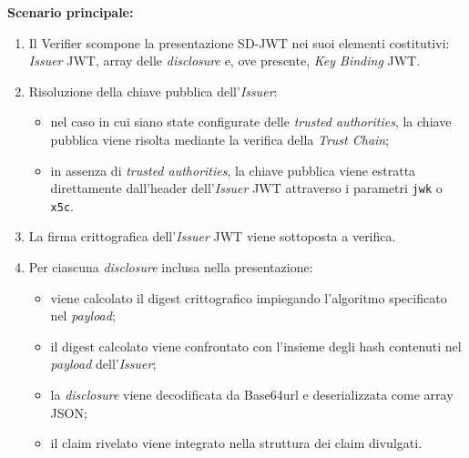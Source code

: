 \noindent\textbf{Scenario principale:}
\begin{enumerate}
    \item Il Verifier scompone la presentazione SD-JWT nei suoi elementi costitutivi: \textit{Issuer} JWT, array delle \textit{disclosure} e, ove presente, \textit{Key Binding} JWT.
    \item Risoluzione della chiave pubblica dell'\textit{Issuer}:
    \begin{itemize}
        \item nel caso in cui siano state configurate delle \textit{trusted authorities}, la chiave pubblica viene risolta mediante la verifica della \textit{Trust Chain};
        \item in assenza di \textit{trusted authorities}, la chiave pubblica viene estratta direttamente dall'header dell'\textit{Issuer} JWT attraverso i parametri \texttt{jwk} o \texttt{x5c}.
    \end{itemize}
    \item La firma crittografica dell'\textit{Issuer} JWT viene sottoposta a verifica.
    \item Per ciascuna \textit{disclosure} inclusa nella presentazione:
    \begin{itemize}
        \item viene calcolato il digest crittografico impiegando l'algoritmo specificato nel \textit{payload};
        \item il digest calcolato viene confrontato con l'insieme degli hash contenuti nel \textit{payload} dell'\textit{Issuer};
        \item la \textit{disclosure} viene decodificata da Base64url e deserializzata come array JSON;
        \item il claim rivelato viene integrato nella struttura dei claim divulgati.
    \end{itemize}
\end{enumerate}

